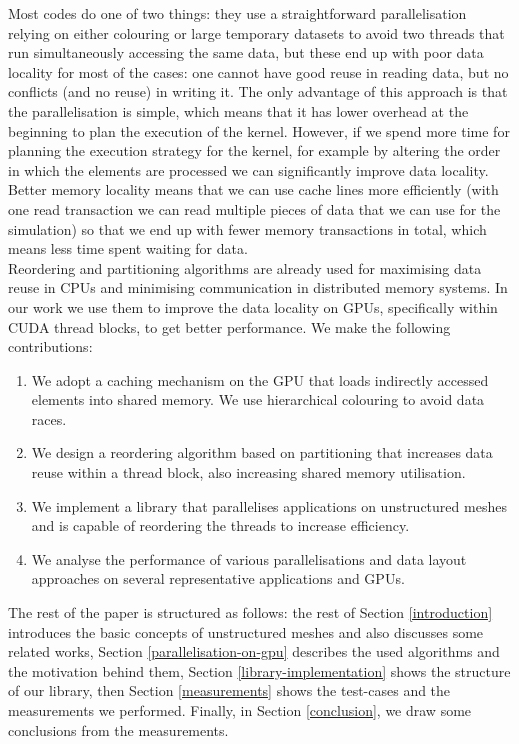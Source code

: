 Most codes do one of two things: they use a straightforward parallelisation
relying on either colouring or large temporary datasets to avoid two threads
that run simultaneously accessing the same data, but these end up with poor
data locality for most of the cases: one cannot have good reuse in reading
data, but no conflicts (and no reuse) in writing it. The only advantage of this
approach is that the parallelisation is simple, which means that it has lower
overhead at the beginning to plan the execution of the kernel. However, if we
spend more time for planning the execution strategy for the kernel, for example
by altering the order in which the elements are processed we can significantly
improve data locality. Better memory locality means that we can use cache lines
more efficiently (with one read transaction we can read multiple pieces of data
that we can use for the simulation) so that we end up with fewer memory
transactions in total, which means less time spent waiting for data.\\
Reordering and partitioning algorithms are already used for maximising data
reuse in CPUs and minimising communication in distributed memory systems. In
our work we use them to improve the data locality on GPUs, specifically within
CUDA thread blocks, to get better performance. We make the following
contributions:
\begin{enumerate}
  \item
    We adopt a caching mechanism on the GPU that loads indirectly accessed
    elements into shared memory. We use hierarchical colouring to avoid data
    races.
  \item
    We design a reordering algorithm based on partitioning that increases data
    reuse within a thread block, also increasing shared memory utilisation.
  \item
    We implement a library that parallelises applications on unstructured meshes
    and is capable of reordering the threads to increase efficiency.
  \item
    We analyse the performance of various parallelisations and data layout
    approaches on several representative applications and GPUs.
\end{enumerate}
The rest of the paper is structured as follows: the rest of Section
\ref{introduction} introduces the basic concepts of unstructured meshes and
also discusses some related works, Section \ref{parallelisation-on-gpu}
describes the used algorithms and the motivation behind them, Section
\ref{library-implementation} shows the structure of our library, then Section
\ref{measurements} shows the test-cases and the measurements we performed.
Finally, in Section \ref{conclusion}, we draw some conclusions from the
measurements.

